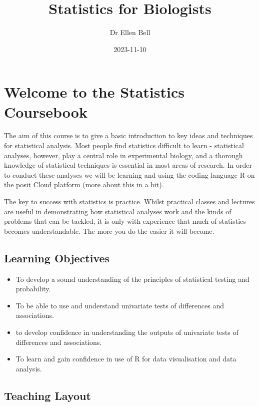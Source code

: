 \documentclass[
]{book}
\title{Statistics for Biologists}
\author{Dr Ellen Bell}
\date{2023-11-10}
\providecommand{\tightlist}{%
  \setlength{\itemsep}{0pt}\setlength{\parskip}{0pt}}
\begin{document}
\maketitle

{
\setcounter{tocdepth}{1}
\tableofcontents
}
\hypertarget{c1}{%
\chapter{Welcome to the Statistics Coursebook}\label{c1}}

The aim of this course is to give a basic introduction to key ideas and techniques for statistical analysis. Most people find statistics difficult to learn - statistical analyses, however, play a central role in experimental biology, and a thorough knowledge of statistical techniques is essential in most areas of research. In order to conduct these analyses we will be learning and using the coding language R on the posit Cloud platform (more about this in a bit).

The key to success with statistics is practice. Whilst practical classes and lectures are useful in demonstrating how statistical analyses work and the kinds of problems that can be tackled, it is only with experience that much of statistics becomes understandable. The more you do the easier it will become.

\hypertarget{learning-objectives}{%
\section{Learning Objectives}\label{learning-objectives}}

\begin{itemize}
\tightlist
\item
  To develop a sound understanding of the principles of statistical testing and probability.
\item
  To be able to use and understand univariate tests of differences and associations.
\item
  to develop confidence in understanding the outputs of univariate tests of differences and associations.
\item
  To learn and gain confidence in use of R for data visualisation and data analysis.
\end{itemize}

\hypertarget{teaching-layout}{%
\section{Teaching Layout}\label{teaching-layout}}
\end{document}
